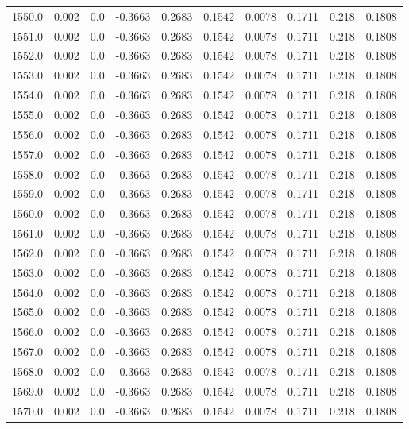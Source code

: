 \begin{longtable}{lrrrrrrrrr}
1550.0 & 0.002 & 0.0 & -0.3663 & 0.2683 & 0.1542 & 0.0078 & 0.1711 & 0.218 & 0.1808 \\
1551.0 & 0.002 & 0.0 & -0.3663 & 0.2683 & 0.1542 & 0.0078 & 0.1711 & 0.218 & 0.1808 \\
1552.0 & 0.002 & 0.0 & -0.3663 & 0.2683 & 0.1542 & 0.0078 & 0.1711 & 0.218 & 0.1808 \\
1553.0 & 0.002 & 0.0 & -0.3663 & 0.2683 & 0.1542 & 0.0078 & 0.1711 & 0.218 & 0.1808 \\
1554.0 & 0.002 & 0.0 & -0.3663 & 0.2683 & 0.1542 & 0.0078 & 0.1711 & 0.218 & 0.1808 \\
1555.0 & 0.002 & 0.0 & -0.3663 & 0.2683 & 0.1542 & 0.0078 & 0.1711 & 0.218 & 0.1808 \\
1556.0 & 0.002 & 0.0 & -0.3663 & 0.2683 & 0.1542 & 0.0078 & 0.1711 & 0.218 & 0.1808 \\
1557.0 & 0.002 & 0.0 & -0.3663 & 0.2683 & 0.1542 & 0.0078 & 0.1711 & 0.218 & 0.1808 \\
1558.0 & 0.002 & 0.0 & -0.3663 & 0.2683 & 0.1542 & 0.0078 & 0.1711 & 0.218 & 0.1808 \\
1559.0 & 0.002 & 0.0 & -0.3663 & 0.2683 & 0.1542 & 0.0078 & 0.1711 & 0.218 & 0.1808 \\
1560.0 & 0.002 & 0.0 & -0.3663 & 0.2683 & 0.1542 & 0.0078 & 0.1711 & 0.218 & 0.1808 \\
1561.0 & 0.002 & 0.0 & -0.3663 & 0.2683 & 0.1542 & 0.0078 & 0.1711 & 0.218 & 0.1808 \\
1562.0 & 0.002 & 0.0 & -0.3663 & 0.2683 & 0.1542 & 0.0078 & 0.1711 & 0.218 & 0.1808 \\
1563.0 & 0.002 & 0.0 & -0.3663 & 0.2683 & 0.1542 & 0.0078 & 0.1711 & 0.218 & 0.1808 \\
1564.0 & 0.002 & 0.0 & -0.3663 & 0.2683 & 0.1542 & 0.0078 & 0.1711 & 0.218 & 0.1808 \\
1565.0 & 0.002 & 0.0 & -0.3663 & 0.2683 & 0.1542 & 0.0078 & 0.1711 & 0.218 & 0.1808 \\
1566.0 & 0.002 & 0.0 & -0.3663 & 0.2683 & 0.1542 & 0.0078 & 0.1711 & 0.218 & 0.1808 \\
1567.0 & 0.002 & 0.0 & -0.3663 & 0.2683 & 0.1542 & 0.0078 & 0.1711 & 0.218 & 0.1808 \\
1568.0 & 0.002 & 0.0 & -0.3663 & 0.2683 & 0.1542 & 0.0078 & 0.1711 & 0.218 & 0.1808 \\
1569.0 & 0.002 & 0.0 & -0.3663 & 0.2683 & 0.1542 & 0.0078 & 0.1711 & 0.218 & 0.1808 \\
1570.0 & 0.002 & 0.0 & -0.3663 & 0.2683 & 0.1542 & 0.0078 & 0.1711 & 0.218 & 0.1808 \\

\end{longtable}
